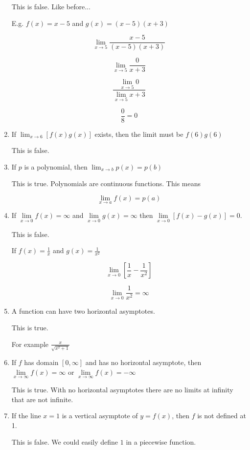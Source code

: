 \documentclass{article}
\begin{document}
\begin{enumerate}
		This is false. Like before...

		E.g. $f(x) = x - 5$ and $g(x) = (x-5)(x+3)$

		$$\lim \limits _{x \to 5} \frac{x-5}{(x-5)(x+3)}$$

		$$\lim \limits _{x \to 5} \frac{0}{x+3}$$

		$$\frac{ \lim \limits _{x \to 5} 0}{\lim \limits _{x \to 5} x + 3}$$

		$$\frac{0}{8} = 0$$

	\item If $\lim _{x \to 6} [f(x)g(x)]$ exists, then the limit must be $f(6)g(6)$

		This is false.

	\item If $p$ is a polynomial, then $\lim _{x \to b} p(x) = p(b)$

		This is true. Polynomials are continuous functions. This means

		$$\lim \limits _{x \to a} f(x) = p(a)$$

	\item If $\lim \limits _{x \to 0} f(x) = \infty$ and $\lim \limits _{x \to 0} g(x) = \infty$
		then $\lim \limits _{x \to 0} [f(x) - g(x)] = 0$.

		This is false.

		If $f(x) = \frac{1}{x}$ and $g(x) = \frac{1}{x^2}$

		$$\lim \limits _{x \to 0} [\frac{1}{x} - \frac{1}{x^2}]$$

		$$\lim \limits _{x \to 0} \frac{1}{x^2} = \infty$$

	\item A function can have two horizontal asymptotes.

		This is true.

		For example $\frac{x}{\sqrt{x^2 + 1}}$

	\item If $f$ has domain $[0, \infty]$ and has no horizontal asymptote, then
		$\lim \limits _{x \to \infty} f(x) = \infty$ or 
		$\lim \limits _{x \to \infty} f(x) = -\infty$

		This is true. With no horizontal asymptotes there are no limits at
		infinity that are not infinite.

	\item If the line $x = 1$ is a vertical asymptote of $y = f(x)$, then $f$ is
		not defined at 1.

		This is false. We could easily define $1$ in a piecewise function.


\end{enumerate}
\end{document}
